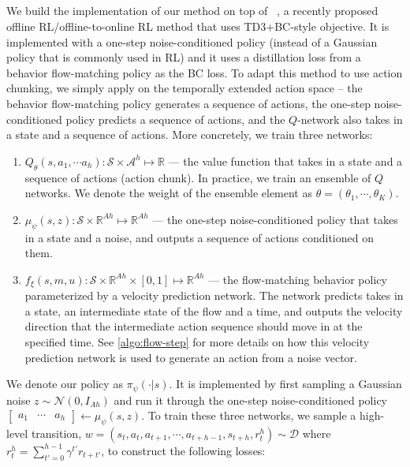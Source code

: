 \subsection{}
We build the implementation of our method on top of ~\citep{park2025flow}, a recently proposed offline RL/offline-to-online RL method that uses TD3+BC-style objective. It is implemented with a one-step noise-conditioned policy (instead of a Gaussian policy that is commonly used in RL) and it uses a distillation loss from a behavior flow-matching policy as the BC loss. To adapt this method to use action chunking, we simply apply  on the temporally extended action space -- the behavior flow-matching policy generates a sequence of actions, the one-step noise-conditioned policy predicts a sequence of actions, and the $Q$-network also takes in a state and a sequence of actions. More concretely, we train three networks: 
\begin{enumerate}
    \item $Q_\theta(s, a_1, \cdots a_h): \mathcal{S}\times \mathcal{A}^h \mapsto \mathbb{R}$ --- the value function that takes in a state and a sequence of actions (action chunk). In practice, we train an ensemble of $Q$ networks. We denote the weight of the ensemble element as $\theta = (\theta_1, \cdots, \theta_K)$.
    \item $\mu_\psi(s, z): \mathcal{S}\times \mathbb{R}^{Ah} \mapsto \mathbb{R}^{Ah}$ --- the one-step noise-conditioned policy that takes in a state and a noise, and outputs a sequence of actions conditioned on them.
    \item $f_\xi(s, m, u): \mathcal{S} \times \mathbb{R}^{Ah} \times [0, 1] \mapsto \mathbb{R}^{Ah}$ --- the flow-matching behavior policy parameterized by a velocity prediction network. The network predicts takes in a state, an intermediate state of the flow and a time, and outputs the velocity direction that the intermediate action sequence should move in at the specified time. See \cref{algo:flow-step} for more details on how this velocity prediction network is used to generate an action from a noise vector.
\end{enumerate}
We denote our policy as $\pi_\psi(\cdot|s)$. It is implemented by first sampling a Gaussian noise $z \sim \mathcal{N}(0, I_{Ah})$ and run it through the one-step noise-conditioned policy $\begin{bmatrix} a_1 & \cdots & a_h \end{bmatrix} \leftarrow \mu_\psi(s, z)$. To train these three networks, we sample a high-level transition, $w = (s_t, a_t, a_{t+1}, \cdots, a_{t+h-1}, s_{t+h}, r^h_t) \sim \mathcal{D}$ where $r^h_t = \sum_{t'=0}^{h-1}\gamma^{t'}r_{t+t'}$, to construct the following losses:



